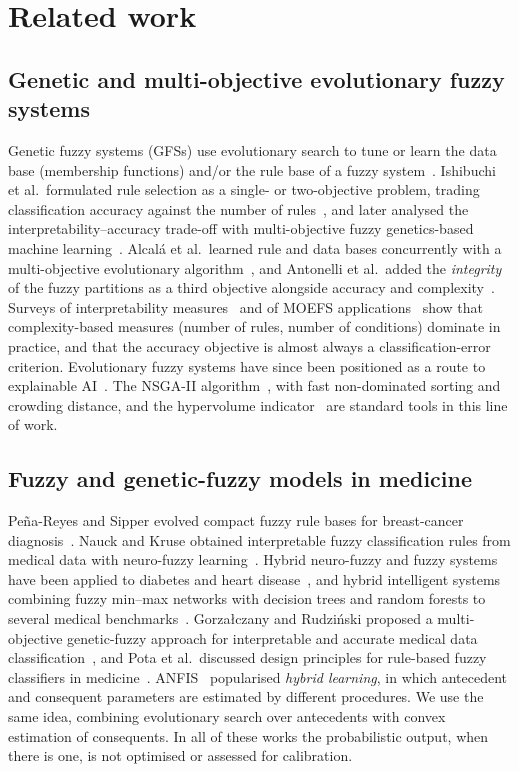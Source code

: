 \section{Related work}
\label{sec:related}

\subsection{Genetic and multi-objective evolutionary fuzzy systems}
Genetic fuzzy systems (GFSs) use evolutionary search to tune or learn the data base
(membership functions) and/or the rule base of a fuzzy system~\cite{herrera2008}.
Ishibuchi et al.\ formulated rule selection as a single- or two-objective problem,
trading classification accuracy against the number of rules~\cite{ishibuchi1997}, and
later analysed the interpretability--accuracy trade-off with multi-objective fuzzy
genetics-based machine learning~\cite{ishibuchi2007}. Alcal\'a et al.\ learned rule and
data bases concurrently with a multi-objective evolutionary algorithm~\cite{alcala2009},
and Antonelli et al.\ added the \emph{integrity} of the fuzzy partitions as a third
objective alongside accuracy and complexity~\cite{antonelli2011}. Surveys of
interpretability measures~\cite{gacto2011} and of MOEFS
applications~\cite{fazzolari2013} show that complexity-based measures (number of
rules, number of conditions) dominate in practice, and that the accuracy objective is
almost always a classification-error criterion. Evolutionary fuzzy systems have since
been positioned as a route to explainable AI~\cite{fernandez2019}. The NSGA-II
algorithm~\cite{deb2002}, with fast non-dominated sorting and crowding distance, and the
hypervolume indicator~\cite{zitzler1999} are standard tools in this line of work.

\subsection{Fuzzy and genetic-fuzzy models in medicine}
Pe\~na-Reyes and Sipper evolved compact fuzzy rule bases for breast-cancer
diagnosis~\cite{penareyes1999}. Nauck and Kruse obtained interpretable fuzzy
classification rules from medical data with neuro-fuzzy learning~\cite{nauck1999}.
Hybrid neuro-fuzzy and fuzzy systems have been applied to diabetes and heart
disease~\cite{kahramanli2008,anooj2012}, and hybrid intelligent systems combining fuzzy
min--max networks with decision trees and random forests to several medical
benchmarks~\cite{seera2014}. Gorza{\l}czany and Rudzi\'nski proposed a multi-objective
genetic-fuzzy approach for interpretable and accurate medical data
classification~\cite{gorzalczany2017}, and Pota et al.\ discussed design principles for
rule-based fuzzy classifiers in medicine~\cite{pota2017}. ANFIS~\cite{jang1993}
popularised \emph{hybrid learning}, in which antecedent and consequent parameters are
estimated by different procedures. We use the same idea, combining evolutionary
search over antecedents with convex estimation of consequents. In all of these works
the probabilistic output, when there is one, is not optimised or assessed for calibration.

